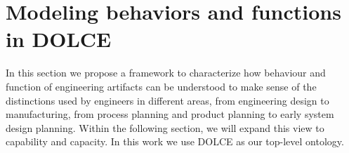 \documentclass[sw]{iosart2x}
\newcommand{\DOLCE}{\textsc{DOLCE}\xspace} %
\begin{document}
\section{Modeling behaviors and functions in \DOLCE \label{sec:capabilitiesEtc}}
In this section we propose a framework to characterize how behaviour and function of engineering artifacts can be understood to make sense of the distinctions used by engineers in different areas, from engineering design to manufacturing, from process planning and product planning to early system design planning. Within the following section, we will expand this view to capability and capacity.
In this work we use \DOLCE as our top-level ontology.
\end{document}
